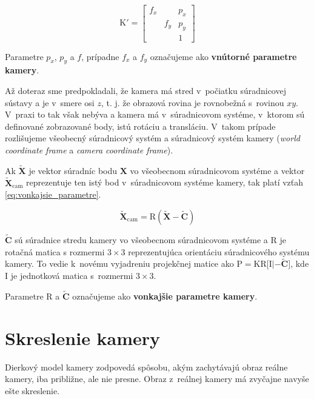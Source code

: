 \begin{equation}
\mathrm{K'} 
=
\begin{bmatrix}
f_x &     &  p_x \\
    & f_y &  p_y \\
    &     &   1  
\end{bmatrix}
\label{eq:kalibracna_matica2}
\end{equation}

Parametre $p_x$, $p_y$ a $f$, prípadne $f_x$ a $f_y$ označujeme ako \textbf{vnútorné parametre kamery}.

Až doteraz sme predpokladali, že kamera má stred v~počiatku súradnicovej sústavy a je  v~smere osi $z$, t. j. že obrazová rovina je rovnobežná s~rovinou $xy$. V~praxi to tak však nebýva a kamera má v~súradnicovom systéme, v~ktorom sú definované zobrazované body, istú rotáciu a transláciu. V~takom prípade rozlišujeme všeobecný súradnicový systém a súradnicový systém kamery (\emph{world coordinate frame} a \emph{camera coordinate frame}).

Ak $\widetilde{\mathbf{X}}$ je vektor súradníc bodu $\mathbf{X}$ vo všeobecnom súradnicovom systéme a vektor $\widetilde{\mathbf{X}}_{\mathrm{cam}}$ reprezentuje ten istý bod v~súradnicovom systéme kamery, tak platí vzťah \ref{eq:vonkajsie_parametre}.

\begin{equation}
\widetilde{\mathbf{X}}_{\mathrm{cam}} = \mathrm{R} (\widetilde{\mathbf{X}} - \widetilde{\mathbf{C}})
\label{eq:vonkajsie_parametre}
\end{equation}

$\widetilde{\mathbf{C}}$ sú súradnice stredu kamery vo všeobecnom súradnicovom systéme a $\mathrm{R}$ je rotačná matica s rozmermi $3 \times 3$ reprezentujúca orientáciu súradnicového systému kamery. To vedie k~novému vyjadreniu projekčnej matice ako $\mathrm{P} = \mathrm{K} \mathrm{R} \bigl[ \mathrm{I} | - \widetilde{\mathbf{C}} \bigr]$, kde $\mathrm{I}$ je jednotková matica s~rozmermi $3 \times 3$.

Parametre $\mathrm{R}$ a $\widetilde{\mathbf{C}}$ označujeme ako \textbf{vonkajšie parametre kamery}.

\section{Skreslenie kamery}
\label{sec:skreslenie}

Dierkový model kamery zodpovedá spôsobu, akým zachytávajú obraz reálne kamery, iba približne, ale nie presne. Obraz z~reálnej kamery má zvyčajne navyše ešte skreslenie.

